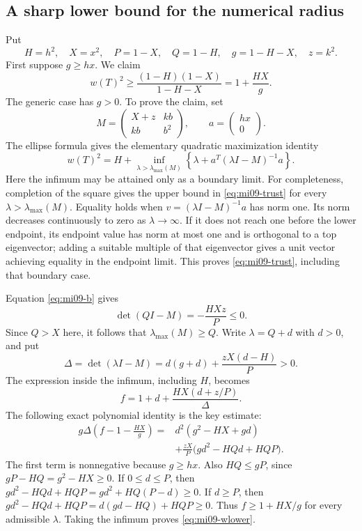 \subsection{A sharp lower bound for the numerical radius}
Put
\[
 H=h^2,\quad X=x^2,\quad P=1-X,\quad Q=1-H,\quad
 g=1-H-X,\quad z=k^2.
\]
First suppose $g\geq hx$. We claim
\begin{equation}\label{eq:mi09-wlower}
 w(T)^2\geq\frac{(1-H)(1-X)}{1-H-X}
 =1+\frac{HX}{g}.
\end{equation}
The generic case has $g>0$. To prove the claim, set
\[
 M=\begin{pmatrix}X+z&kb\\kb&b^2\end{pmatrix},\qquad a=\begin{pmatrix}hx\\0\end{pmatrix}.
\]
The ellipse formula gives the elementary quadratic maximization identity
\begin{equation}\label{eq:mi09-trust}
 w(T)^2=H+\inf_{\lambda>\lambda_{\max}(M)}
 \left\{\lambda+a^T(\lambda I-M)^{-1}a\right\}.
\end{equation}
Here the infimum may be attained only as a boundary limit. For completeness, completion of the square gives the upper bound in \eqref{eq:mi09-trust} for every $\lambda>\lambda_{\max}(M)$. Equality holds when $v=(\lambda I-M)^{-1}a$ has norm one. Its norm decreases continuously to zero as $\lambda\to\infty$. If it does not reach one before the lower endpoint, its endpoint value has norm at most one and is orthogonal to a top eigenvector; adding a suitable multiple of that eigenvector gives a unit vector achieving equality in the endpoint limit. This proves \eqref{eq:mi09-trust}, including that boundary case.

Equation \eqref{eq:mi09-b} gives
\[
 \det(QI-M)=-\frac{HXz}{P}\leq0.
\]
Since $Q>X$ here, it follows that $\lambda_{\max}(M)\geq Q$. Write $\lambda=Q+d$ with $d>0$, and put
\[
 \Delta=\det(\lambda I-M)=d(g+d)+\frac{zX(d-H)}P>0.
\]
The expression inside the infimum, including $H$, becomes
\[
 f=1+d+\frac{HX(d+z/P)}{\Delta}.
\]
The following exact polynomial identity is the key estimate:
\begin{align*}
 g\Delta\left(f-1-\frac{HX}{g}\right)
 ={}&d^2(g^2-HX+gd)\\
 &+\frac{zX}{P}\bigl(gd^2-HQd+HQP\bigr).
\end{align*}
The first term is nonnegative because $g\geq hx$. Also
$HQ\leq gP$, since $gP-HQ=g^2-HX\geq0$.
If $0\leq d\leq P$, then
$gd^2-HQd+HQP=gd^2+HQ(P-d)\geq0$.
If $d\geq P$, then
$gd^2-HQd+HQP=d(gd-HQ)+HQP\geq0$.
Thus $f\geq1+HX/g$ for every admissible $\lambda$. Taking the infimum proves \eqref{eq:mi09-wlower}.

